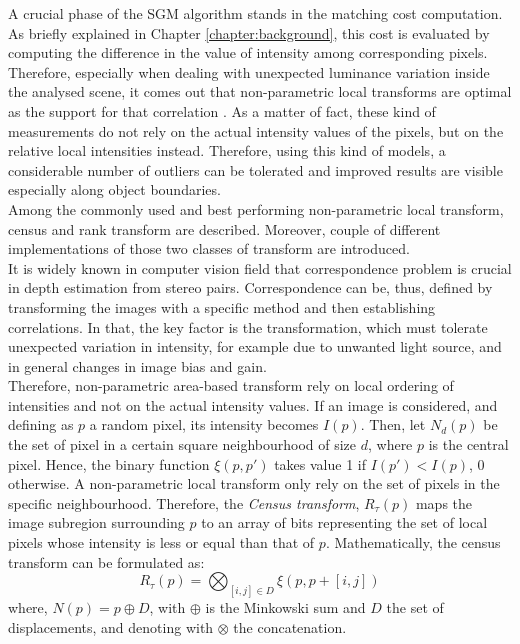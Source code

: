 A crucial phase of the SGM algorithm stands in the matching cost computation.
As briefly explained in Chapter \ref{chapter:background}, this cost is evaluated by computing the difference in the value of intensity among corresponding pixels.
Therefore, especially when dealing with unexpected luminance variation inside the analysed scene, it comes out that non-parametric local transforms are optimal as the support for that correlation \cite{Zabih1994}.
As a matter of fact, these kind of measurements do not rely on the actual intensity values of the pixels, but on the relative local intensities instead.
Therefore, using this kind of models, a considerable number of outliers can be tolerated and improved results are visible especially along object boundaries.\\
Among the commonly used and best performing non-parametric local transform, census and rank transform are described.
Moreover, couple of different implementations of those two classes of transform are introduced.\\
It is widely known in computer vision field that correspondence problem is crucial in depth estimation from stereo pairs.
Correspondence can be, thus, defined by transforming the images with a specific method and then establishing correlations.
In that, the key factor is the transformation, which must tolerate unexpected variation in intensity, for example due to unwanted light source, and in general changes in image bias and gain.\\
Therefore, non-parametric area-based transform rely on local ordering of intensities and not on the actual intensity values.
If an image is considered, and defining as $p$ a random pixel, its intensity becomes $I(p)$. 
Then, let $N_d(p)$ be the set of pixel in a certain square neighbourhood of size $d$, where $p$ is the central pixel. 
Hence, the binary function $\xi(p, p')$ takes value 1 if $I(p') < I(p)$, 0 otherwise.
A non-parametric local transform only rely on the set of pixels in the specific neighbourhood.
Therefore, the \textit{Census transform}, $R_{\tau}(p)$ maps the image subregion surrounding $p$ to an array of bits representing the set of local pixels whose intensity is less or equal than that of $p$. 
Mathematically, the census transform can be formulated as:
\begin{equation}
	\label{eqn:census-transform}
	R_{\tau}(p) = \bigotimes_{[i, j] \in D} \xi(p, p +[i, j])
\end{equation}
where, $N(p) = p \oplus D$, with $\oplus$ is the Minkowski sum and $D$ the set of displacements, and denoting with $\otimes$ the concatenation. 
